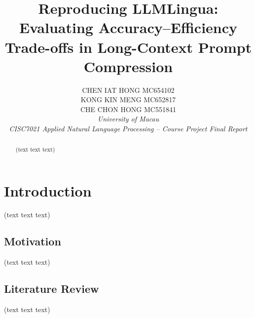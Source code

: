 \documentclass[10pt,a4paper,twocolumn]{article}
\title{Reproducing LLMLingua: Evaluating Accuracy--Efficiency Trade-offs in Long-Context Prompt Compression}
\author{
CHEN IAT HONG \quad MC654102\\
KONG KIN MENG \quad MC652817\\
CHE CHON HONG \quad MC551841\\
\textit{University of Macau}\\
\textit{CISC7021 Applied Natural Language Processing -- Course Project Final Report}
}
\date{}
\begin{document}
\maketitle
\vspace{-0.8cm}


\begin{abstract}
(text text text)

\end{abstract}

\section{Introduction}
(text text text)

\subsection{Motivation}
(text text text)


\subsection{Literature Review}
(text text text)

\end{document}
